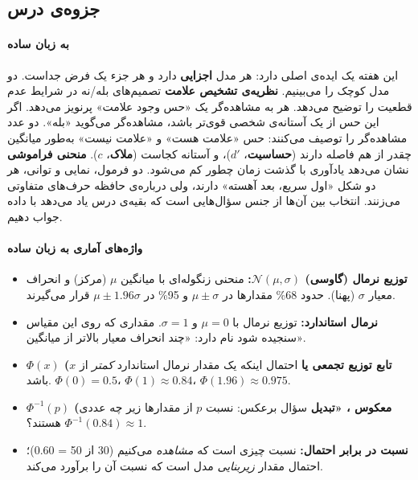 \subsection{جزوه‌ی درس}

\paragraph{به زبان ساده}

این هفته یک ایده‌ی اصلی دارد: هر مدل \textbf{اجزایی} دارد و هر جزء یک فرض
جداست. دو مدل کوچک را می‌بینیم. \textbf{نظریه‌ی تشخیص علامت }
تصمیم‌های بله/نه در شرایط عدم قطعیت را توضیح می‌دهد. هر  به
مشاهده‌گر یک «حس وجود علامت» پرنویز می‌دهد. اگر این حس از یک آستانه‌ی شخصی
قوی‌تر باشد، مشاهده‌گر می‌گوید «بله». دو عدد مشاهده‌گر را توصیف می‌کنند: حس
«علامت هست» و «علامت نیست» به‌طور میانگین چقدر از هم فاصله دارند
(\textbf{حساسیت}، \(d'\))، و آستانه کجاست (\textbf{ملاک}، \(c\)).
\textbf{منحنی فراموشی} نشان می‌دهد یادآوری با گذشت زمان چطور کم می‌شود. دو
فرمول، نمایی و توانی، هر دو شکل «اول سریع، بعد آهسته» دارند، ولی درباره‌ی
حافظه حرف‌های متفاوتی می‌زنند. انتخاب بین آن‌ها از جنس سؤال‌هایی است که
بقیه‌ی درس یاد می‌دهد با داده جواب دهیم.

\paragraph{واژه‌های آماری به زبان ساده}

\begin{itemize}
\tightlist
\item
  \textbf{توزیع نرمال (گاوسی) \(\mathcal{N}(\mu, \sigma)\):} منحنی
  زنگوله‌ای با میانگین \(\mu\) (مرکز) و انحراف معیار \(\sigma\) (پهنا).
  حدود 68\% مقدارها در \(\mu \pm \sigma\) و 95\% در
  \(\mu \pm 1.96\sigma\) قرار می‌گیرند.
\item
  \textbf{نرمال استاندارد:} توزیع نرمال با \(\mu = 0\) و \(\sigma = 1\).
  مقداری که روی این مقیاس سنجیده شود \textbf{} نام دارد:
  «چند انحراف معیار بالاتر از میانگین».
\item
  \textbf{\(\Phi(x)\) (تابع توزیع تجمعی یا } احتمال اینکه یک
  مقدار نرمال استاندارد \emph{کمتر} از \(x\) باشد. \(\Phi(0) = 0.5\)،
  \(\Phi(1) \approx 0.84\)، \(\Phi(1.96) \approx 0.975\).
\item
  \textbf{\(\Phi^{-1}(p)\) (معکوس ، «تبدیل } سؤال
  برعکس: نسبت \(p\) از مقدارها زیر چه عددی هستند؟
  \(\Phi^{-1}(0.84) \approx 1\).
\item
  \textbf{نسبت در برابر احتمال:} نسبت چیزی است که \emph{مشاهده} می‌کنیم
  (30 از 50 = 0.60)؛ احتمال مقدار \emph{زیربنایی} مدل است که نسبت آن را
  برآورد می‌کند.
\end{itemize}

